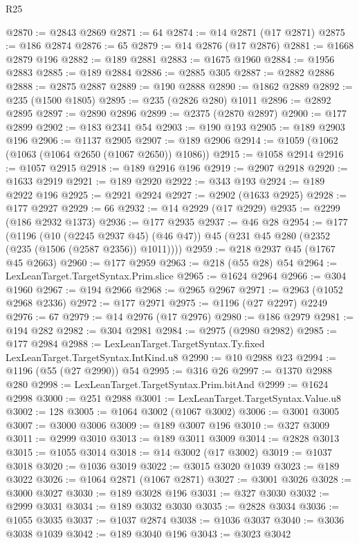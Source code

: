 \begin{lexlean}{R25}
\begin{coremodule}
@2870 := @2843 @2869
@2871 := 64
@2874 := @14 @2871 (@17 @2871)
@2875 := @186 @2874
@2876 := 65
@2879 := @14 @2876 (@17 @2876)
@2881 := @1668 @2879 @196
@2882 := @189 @2881
@2883 := @1675 @1960
@2884 := @1956 @2883
@2885 := @189 @2884
@2886 := @2885 @305
@2887 := @2882 @2886
@2888 := @2875 @2887
@2889 := @190 @2888
@2890 := @1862 @2889
@2892 := @235 (@1500 @1805)
@2895 := @235 (@2826 @280) @1011
@2896 := @2892 @2895
@2897 := @2890 @2896
@2899 := @2375 (@2870 @2897)
@2900 := @177 @2899
@2902 := @183 @2341 @54
@2903 := @190 @193
@2905 := @189 @2903 @196
@2906 := @1137 @2905
@2907 := @189 @2906
@2914 := @1059 (@1062 (@1063 (@1064 @2650 (@1067 @2650)) @1086))
@2915 := @1058 @2914
@2916 := @1057 @2915
@2918 := @189 @2916 @196
@2919 := @2907 @2918
@2920 := @1633 @2919
@2921 := @189 @2920
@2922 := @343 @193
@2924 := @189 @2922 @196
@2925 := @2921 @2924
@2927 := @2902 (@1633 @2925)
@2928 := @177 @2927
@2929 := 66
@2932 := @14 @2929 (@17 @2929)
@2935 := @2299 (@186 @2932 @1373)
@2936 := @177 @2935
@2937 := @46 @28
@2954 := @177
    (@1196
      (@10 (@2245 @2937 @45) (@46 @47))
      @45
      (@231 @45 @280 (@2352 (@235 (@1506 (@2587 @2356)) @1011))))
@2959 := @218 @2937 @45 (@1767 @45 @2663)
@2960 := @177 @2959
@2963 := @218 (@55 @28) @54
@2964 := LexLeanTarget.TargetSyntax.Prim.slice
@2965 := @1624 @2964
@2966 := @304 @1960
@2967 := @194 @2966
@2968 := @2965 @2967
@2971 := @2963 (@1052 @2968 @2336)
@2972 := @177 @2971
@2975 := @1196 (@27 @2297) @2249
@2976 := 67
@2979 := @14 @2976 (@17 @2976)
@2980 := @186 @2979
@2981 := @194 @282
@2982 := @304 @2981
@2984 := @2975 (@2980 @2982)
@2985 := @177 @2984
@2988 := LexLeanTarget.TargetSyntax.Ty.fixed LexLeanTarget.TargetSyntax.IntKind.u8
@2990 := @10 @2988 @23
@2994 := @1196 (@55 (@27 @2990)) @54
@2995 := @316 @26
@2997 := @1370 @2988 @280
@2998 := LexLeanTarget.TargetSyntax.Prim.bitAnd
@2999 := @1624 @2998
@3000 := @251 @2988
@3001 := LexLeanTarget.TargetSyntax.Value.u8
@3002 := 128
@3005 := @1064 @3002 (@1067 @3002)
@3006 := @3001 @3005
@3007 := @3000 @3006
@3009 := @189 @3007 @196
@3010 := @327 @3009
@3011 := @2999 @3010
@3013 := @189 @3011 @3009
@3014 := @2828 @3013
@3015 := @1055 @3014
@3018 := @14 @3002 (@17 @3002)
@3019 := @1037 @3018
@3020 := @1036 @3019
@3022 := @3015 @3020 @1039
@3023 := @189 @3022
@3026 := @1064 @2871 (@1067 @2871)
@3027 := @3001 @3026
@3028 := @3000 @3027
@3030 := @189 @3028 @196
@3031 := @327 @3030
@3032 := @2999 @3031
@3034 := @189 @3032 @3030
@3035 := @2828 @3034
@3036 := @1055 @3035
@3037 := @1037 @2874
@3038 := @1036 @3037
@3040 := @3036 @3038 @1039
@3042 := @189 @3040 @196
@3043 := @3023 @3042

\end{coremodule}
\end{lexlean}
